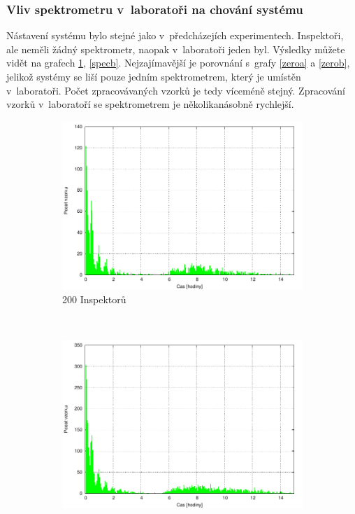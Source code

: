 \documentclass[11pt,a4paper]{article}
\begin{document}
\subsubsection*{Vliv spektrometru v~laboratoři na chování systému}
Nástavení systému bylo stejné jako v~předcházejích experimentech. 
Inspektoři, ale neměli žádný spektrometr, naopak v~laboratoři jeden byl.
Výsledky můžete vidět na grafech \ref{speca}, \ref{specb}. Nejzajímavější
je porovnání s~grafy \ref{zeroa} a \ref{zerob}, jelikož systémy se liší
pouze jedním spektrometrem, který je umístěn v~laboratoři. Počet
zpracovávaných vzorků je tedy víceméně stejný. Zpracování vzorků 
v~laboratoří se spektrometrem je několikanásobně rychlejší.

\begin{figure}[h!]
  \centering
  \begin{subfigure}[t]{0.5\textwidth}
    \centering
    \includegraphics[width=\textwidth]{exp5_200}
    \caption{200 Inspektorů}
    \label{speca}
  \end{subfigure}~\begin{subfigure}[t]{0.5\textwidth}
    \centering
    \includegraphics[width=\textwidth]{exp5_500}

\end{subfigure}
\end{figure}
\end{document}

